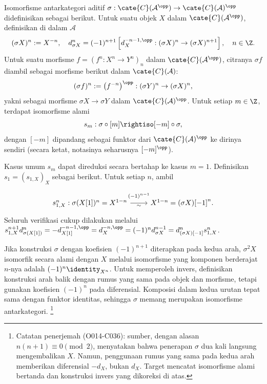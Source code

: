 \begin{definisiproposisi}\label{def:sigma}
	Isomorfisme antarkategori aditif
	$\sigma:\cate{C}(\mathcal{A}^{\opp})\to\cate{C}(\mathcal{A})^{\opp}$
	didefinisikan sebagai berikut. Untuk suatu objek $X$ dalam
	$\cate{C}(\mathcal{A}^{\opp})$, definisikan di dalam $\mathcal{A}$
	\[ (\sigma X)^n := X^{-n}, \quad d_{\sigma X}^n = (-1)^{n+1} \left[ d_X^{-n-1, \opp}: (\sigma X)^n \to (\sigma X)^{n+1} \right], \quad n \in \Z. \]
	Untuk suatu morfisme
	$f=\left(f^n:X^n\to Y^n\right)_n$ dalam
	$\cate{C}(\mathcal{A}^{\opp})$, citranya $\sigma f$ diambil sebagai
	morfisme berikut dalam $\cate{C}(\mathcal{A})$:
	\[ (\sigma f)^n := \left(f^{-n} \right)^{\opp} : (\sigma Y)^n \to (\sigma X)^n, \]
	yakni sebagai morfisme $\sigma X\to\sigma Y$ dalam
	$\cate{C}(\mathcal{A})^{\opp}$. Untuk setiap $m\in\Z$, terdapat
	isomorfisme alami
	\[ s_m: \sigma \circ [m] \rightiso [-m] \circ \sigma, \]
	dengan $[-m]$ dipandang sebagai funktor dari
	$\cate{C}(\mathcal{A})^{\opp}$ ke dirinya sendiri (secara ketat, notasinya
	seharusnya $[-m]^{\opp}$).
\end{definisiproposisi}
\begin{bukti}
	Kasus umum $s_m$ dapat direduksi secara bertahap ke kasus $m=1$.
	Definisikan $s_1=(s_{1,X})_X$ sebagai berikut. Untuk setiap $n$, ambil
	\begin{equation}\label{eqn:sigma-s}\begin{tikzcd}[row sep=tiny]
		s_{1,X}^n : \sigma(X{[1]})^n = X^{1-n} \arrow[r, "\sim"', "{(-1)^{n-1}}" inner sep=0.6em] & X^{1-n} = (\sigma X){[-1]}^n .
	\end{tikzcd}\end{equation}
	Seluruh verifikasi cukup dilakukan melalui
	$s_{1, X}^{n+1} d^n_{\sigma(X[1])} = -d_{X[1]}^{-n-1, \opp} =
	d_X^{-n, \opp} = (-1)^n d_{\sigma X}^{n-1} =
	d^n_{(\sigma X)[-1]} s_{1,X}^n$.
\end{bukti}

Jika konstruksi $\sigma$ dengan koefisien $(-1)^{n+1}$ diterapkan pada kedua
arah, $\sigma^2X$ isomorfik secara alami dengan $X$ melalui isomorfisme yang
komponen berderajat $n$-nya adalah $(-1)^n\identity_{X^n}$. Untuk memperoleh
invers, definisikan konstruksi arah balik dengan rumus yang sama pada objek
dan morfisme, tetapi gunakan koefisien $(-1)^n$ pada diferensial. Komposisi
dalam kedua urutan tepat sama dengan funktor identitas, sehingga $\sigma$
memang merupakan isomorfisme antarkategori.%
\footnote{Catatan penerjemah (O014-C036): sumber, dengan alasan
$n(n+1)\equiv0\pmod{2}$, menyatakan bahwa penerapan $\sigma$ dua kali
langsung mengembalikan $X$. Namun, penggunaan rumus yang sama pada kedua arah
memberikan diferensial $-d_X$, bukan $d_X$. Target mencatat isomorfisme alami
bertanda dan konstruksi invers yang dikoreksi di atas.}

